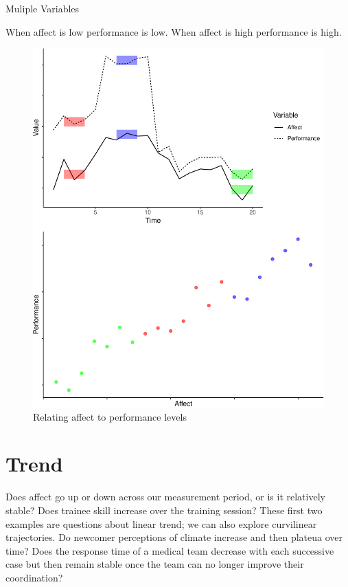 \documentclass[english,,man]{apa6}
\theoremstyle{definition}
\theoremstyle{definition}
\theoremstyle{definition}
\theoremstyle{remark}
\begin{document}
Muliple Variables

When affect is low performance is low. When affect is high performance
is high.

\begin{figure}
\centering
\includegraphics{figures/unnamed-chunk-10-1.pdf}
\caption{\label{fig:unnamed-chunk-10}Relating affect to performance
levels\label{level_relation}}
\end{figure}

\hypertarget{trend}{%
\section{Trend}\label{trend}}

Does affect go up or down across our measurement period, or is it
relatively stable? Does trainee skill increase over the training
session? These first two examples are questions about linear trend; we
can also explore curvilinear trajectories. Do newcomer perceptions of
climate increase and then plateua over time? Does the response time of a
medical team decrease with each successive case but then remain stable
once the team can no longer improve their coordination?
\end{document}
